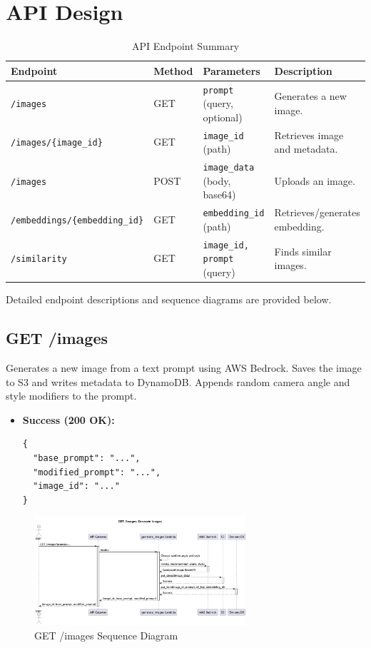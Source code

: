 \documentclass{article}
\begin{document}
\section{API Design}

\begin{table}[h!]
\centering
\begin{tabular}{|l|l|l|l|}
\hline
\textbf{Endpoint} & \textbf{Method} & \textbf{Parameters} & \textbf{Description} \\ \hline
\texttt{/images} & GET & \texttt{prompt} (query, optional) & Generates a new image. \\
\texttt{/images/\{image\_id\}} & GET & \texttt{image\_id} (path) & Retrieves image and metadata. \\
\texttt{/images} & POST & \texttt{image\_data} (body, base64) & Uploads an image. \\
\texttt{/embeddings/\{embedding\_id\}} & GET & \texttt{embedding\_id} (path) & Retrieves/generates embedding. \\
\texttt{/similarity} & GET & \texttt{image\_id, prompt} (query) & Finds similar images. \\ \hline
\end{tabular}
\caption{API Endpoint Summary}
\label{tab:api_summary}
\end{table}

\noindent Detailed endpoint descriptions and sequence diagrams are provided below.

\subsection{GET /images}
Generates a new image from a text prompt using AWS Bedrock. Saves the image to S3 and writes metadata to DynamoDB. Appends random camera angle and style modifiers to the prompt.

\begin{itemize}[noitemsep,topsep=0pt,parsep=0pt,partopsep=0pt]
    \item \textbf{Success (200 OK):}
    \begin{lstlisting}
{
  "base_prompt": "...",
  "modified_prompt": "...",
  "image_id": "..."
}
    \end{lstlisting}
\end{itemize}

\begin{figure}[h!]
  \centering
  \includegraphics[width=0.7\textwidth]{uml/generate_images.png} %
  \caption{GET /images Sequence Diagram}
\end{figure}
\end{document}
